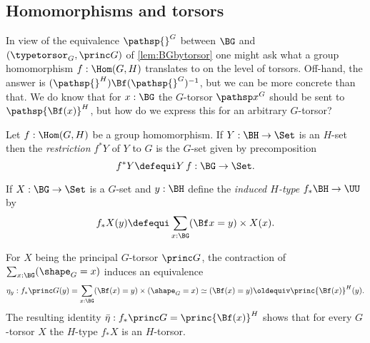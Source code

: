 \subsection{Homomorphisms and torsors}
\label{sec:homotor}
In view of the equivalence $\pathsp{}^G$ between $\BG$ and $(\typetorsor_G,\princ G)$ of \cref{lem:BGbytorsor} one might ask what a group homomorphism  $f:\Hom(G,H)$ translates to on the level of torsors.  Off-hand, the answer is $(\pathsp{}^H)\Bf(\pathsp{}^G)^{-1}$, but we can be more concrete than that.  We do know that for $x:\BG$ the $G$-torsor $\pathsp x^G$ should be sent to $\pathsp {\Bf(x)}^H$, but how do we express this for an arbitrary $G$-torsor?
\begin{definition}
  \label{def:restrictandinduce}
  Let $f:\Hom(G,H)$ be a group homomorphism.  If $Y:\BH\to\Set$ is an $H$-set then the \emph{restriction} $f^*Y$ of $Y$ to $G$ is the $G$-set given by precomposition
$$f^*Y\defequi Y\, f:\BG\to\Set.$$

If $X:\BG\to\Set$ is a $G$-set and $y:\BH$ define
the \emph{induced $H$-type}
$f_*\BH\to\UU$ by
$$f_*X(y)\defequi\sum_{x:\BG}(\Bf x =y)\times X(x).$$
\end{definition}

For $X$ being the principal $G$-torsor  $\princ G$, the contraction of $\sum_{x:\BG}(\shape_G=x)$ induces an equivalence
$$\eta_y:f_*\princ G(y)=\sum_{x:\BG}(\Bf(x)=y)\times(\shape_G=x)\simeq (\Bf(x)=y)\oldequiv\princ{\Bf(x)}^H(y).$$  The resulting identity $\bar\eta:f_*\princ G=\princ{\Bf(x)}^H$ shows that for every $G$-torsor $X$ the $H$-type $f_*X$ is an $H$-torsor.

